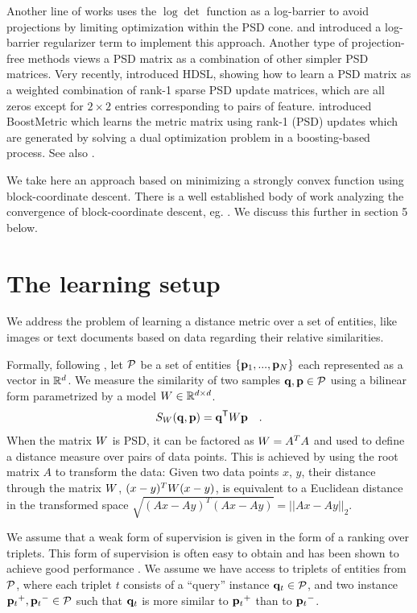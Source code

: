 \documentclass{article}
\begin{document}
Another line of works uses the $\log \det$ function as a log-barrier to avoid projections by limiting optimization within the PSD cone. \citet{davis2007information} and \citet{lego} introduced a log-barrier regularizer term to implement this approach. Another type of projection-free methods views a PSD matrix as a combination of other simpler PSD matrices. Very recently, \citet{hdsl} introduced HDSL, showing how to learn a PSD matrix as a weighted combination of rank-1 sparse PSD update matrices, which are all zeros except for $2\times2$ entries corresponding to pairs of feature. \citet{boost} introduced BoostMetric which learns the metric matrix using rank-1 (PSD) updates which are generated by solving a dual optimization problem in a boosting-based process. See also \citet{bi2011adaboost, liu2012robust}.

We take here an approach based on minimizing a strongly convex function using block-coordinate descent. There is a well established body of work analyzing the convergence of block-coordinate descent, eg. \cite{nesterov2012efficiency,richtarik2014iteration}. We discuss this further in section 5 below.


\section{The learning setup}
We address the problem of learning a distance metric over a set of
entities, like images or text documents based on data regarding their
relative similarities.

Formally, following \citet{OASIS}, let $\cal{P}$ be a set of entities
$\{{\mathbf{p}}_1,...,{\mathbf{p}}_N\}$ each represented as a vector in $\mathbb{R}^d$.  We measure
the similarity of two samples ${\mathbf{q}}, {\mathbf{p}} \in \cal{P}$ using a bilinear
form parametrized by a model ${W} \in \mathbb{R}^{d \times d}$.
\begin{equation}
  S_{{W}}({\mathbf{q}}, {\mathbf{p}}) = {\mathbf{q}}{}^\mathsf{T} {W} {\mathbf{p}} \quad.
\end{equation}
When the matrix ${W}$ is PSD, it can be factored as ${W} = A^TA$ and used to define a distance measure over pairs of data points. This is achieved by using the root matrix $A$ to transform the data: Given two data points $x$, $y$, their distance through the matrix ${W}$, $(x-y)^T{W}(x-y)$, is equivalent to a Euclidean distance in the transformed space  $\sqrt{(Ax-Ay)^T(Ax-Ay)} = ||Ax-Ay||_2$. 

We assume that a weak form of supervision is given in the form of a
ranking over triplets. This form of supervision is often easy
to obtain and has been shown to achieve good performance
\cite{weinberger2006dml,OASIS,qian}. We assume we have access to
triplets of entities from $\cal{P}$, where each triplet $t$ consists of
a ``query'' instance ${{\mathbf{q}}_{{t}}} \in \cal{P}$, and two instance ${{\mathbf{p}}_{{t}}}^{+}, {{\mathbf{p}}_{{t}}}^{-} \in \cal{P}$ such that ${{\mathbf{q}}_{{t}}}$ is more similar to ${{\mathbf{p}}_{{t}}}^{+}$
than to ${{\mathbf{p}}_{{t}}}^{-}$.
\end{document}
